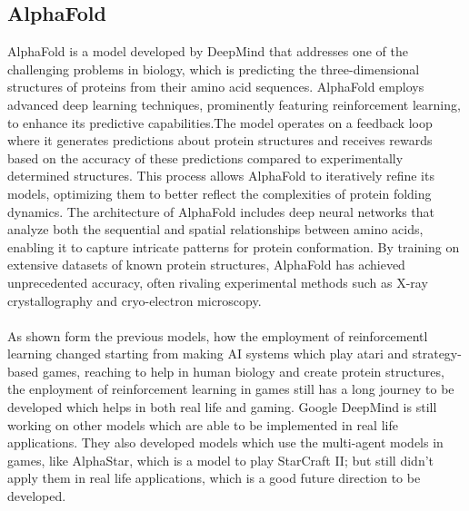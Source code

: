 \subsection*{AlphaFold}
AlphaFold is a model developed by DeepMind 
that addresses one of the challenging problems in biology, which is
predicting the three-dimensional structures of proteins from their 
amino acid sequences. AlphaFold employs 
advanced deep learning techniques, prominently featuring 
reinforcement learning, to enhance its predictive capabilities.The 
model operates on a feedback loop where 
it generates predictions about protein structures and receives 
rewards based on the accuracy of these predictions compared to 
experimentally determined structures. This process allows AlphaFold 
to iteratively refine its models, optimizing them to better reflect 
the complexities of protein folding dynamics. The architecture of 
AlphaFold includes deep neural networks that analyze both the 
sequential and spatial relationships between amino acids, enabling 
it to capture intricate patterns for protein conformation. 
By training on extensive datasets of known protein structures, 
AlphaFold has achieved unprecedented accuracy, often rivaling 
experimental methods such as X-ray crystallography and cryo-electron 
microscopy\cite{FD2}.\\\\
As shown form the previous models, how the employment of reinforcementl
learning changed starting from making AI systems which play atari and strategy-based games, 
reaching to help in human biology and create protein structures, the 
enployment of reinforcement learning in games still has a long journey
to be developed which helps in both real life and gaming. Google DeepMind
is still working on other models which are able to be implemented 
in real life applications. They also developed models which use the multi-agent
models in games, like AlphaStar, which is a model to play 
StarCraft II; but still didn't apply them in real life applications, which
is a good future direction to be developed.